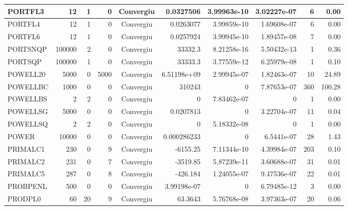 \begin{center}
\begin{longtable}{|l|r|r|r|c|r|r|r|r|r|}
 PORTFL3 &     12 &      1 &      0 & Convergiu  &   0.0327506 &    3.99963e-10 & 3.02227e-07 &      6 &    0.00 \\ \hline
 PORTFL4 &     12 &      1 &      0 & Convergiu  &   0.0263077 &    3.99859e-10 & 1.69608e-07 &      6 &    0.00 \\ \hline
 PORTFL6 &     12 &      1 &      0 & Convergiu  &   0.0257924 &    3.99945e-10 & 1.89457e-08 &      7 &    0.00 \\ \hline
PORTSNQP & 100000 &      2 &      0 & Convergiu  &     33332.3 &    8.21258e-16 & 5.50432e-13 &      1 &    0.36 \\ \hline
 PORTSQP & 100000 &      1 &      0 & Convergiu  &     33333.3 &    3.77559e-12 & 6.25979e-08 &      1 &    0.10 \\ \hline
POWELL20 &   5000 &      0 &   5000 & Convergiu  & 6.51198e+09 &    2.99945e-07 & 1.82463e-07 &     10 &   24.89 \\ \hline
POWELLBC &   1000 &      0 &      0 & Convergiu  &      310243 &              0 & 7.87653e-07 &    360 &  100.28 \\ \hline
POWELLBS &      2 &      2 &      0 & Convergiu  &           0 &    7.83462e-07 &           0 &      1 &    0.00 \\ \hline
POWELLSG &   5000 &      0 &      0 & Convergiu  &   0.0207813 &              0 & 3.22704e-07 &     11 &    0.04 \\ \hline
POWELLSQ &      2 &      2 &      0 & Convergiu  &           0 &    5.18332e-08 &           0 &      1 &    0.00 \\ \hline
   POWER &  10000 &      0 &      0 & Convergiu  & 0.000286233 &              0 &  6.5441e-07 &     28 &    1.43 \\ \hline
PRIMALC1 &    230 &      0 &      9 & Convergiu  &    -6155.25 &    7.11344e-10 & 4.39984e-07 &    203 &    0.10 \\ \hline
PRIMALC2 &    231 &      0 &      7 & Convergiu  &    -3519.85 &    5.87239e-11 & 3.60688e-07 &     31 &    0.01 \\ \hline
PRIMALC5 &    287 &      0 &      8 & Convergiu  &    -426.184 &    1.24055e-07 & 9.47536e-07 &     22 &    0.01 \\ \hline
PROBPENL &    500 &      0 &      0 & Convergiu  & 3.99198e-07 &              0 & 6.79485e-12 &      3 &    0.00 \\ \hline
 PRODPL0 &     60 &     20 &      9 & Convergiu  &     63.3643 &    5.76768e-08 & 3.97363e-07 &     20 &    0.06 \\ \hline

\end{longtable}
\end{center}
